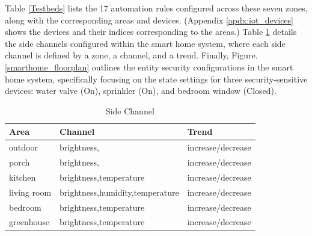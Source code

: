 Table \ref{Testbeds} lists the 17 automation rules configured across these seven zones, along with the corresponding areas and devices. (Appendix \ref{apdx:iot_devices} shows the devices and their indices corresponding to the areas.) Table \ref{side_channel} details the side channels configured within the smart home system, where each side channel is defined by a zone, a channel, and a trend. Finally, Figure.\ref{smarthome_floorplan} outlines the entity security configurations in the smart home system, specifically focusing on the state settings for three security-sensitive devices: water valve (On), sprinkler (On), and bedroom window (Closed).

\begin{table}[htbp]
	\caption{Side Channel}
	\label{side_channel}
	\begin{tabular}[width=0.45\textwidth]{l|l|l}
		\hline
		\textbf{Area} & \textbf{Channel} & \textbf{Trend} \\
		\hline
		outdoor& brightness, & increase/decrease \\
		\hline
		porch& brightness, & increase/decrease \\
		\hline
		kitchen& brightness,temperature & increase/decrease \\
		\hline
		living room & brightness,humidity,temperature & increase/decrease \\
		\hline
		bedroom & brightness,temperature & increase/decrease \\
		\hline
		greenhouse & brightness,temperature & increase/decrease \\
		\hline
	\end{tabular}
\end{table}


